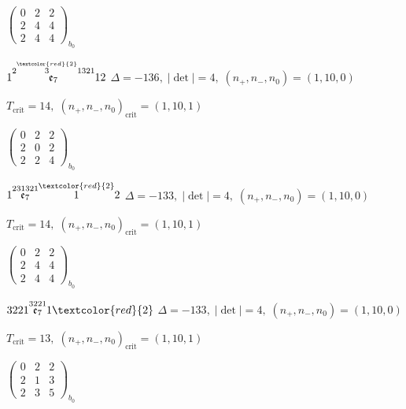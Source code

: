 \documentclass[10pt]{article}
\begin{document}
\hspace{2em}$\left(\begin{smallmatrix}0 & 2 & 2 \\ 2 & 4 & 4 \\ 2 & 4 & 4\end{smallmatrix}\right)_{\!b_0}$

\smallskip

$1\overset{2\overset{\textcolor{red}{2}}{3}1321}{\mathfrak{e}_7}12$ \quad $\Delta=-136,\; |\det|=4,\; (n_+,n_-,n_0)=(1,10,0)$

\hspace{1em}$T_{\text{crit}}=14,\; (n_+,n_-,n_0)_{\text{crit}}=(1,10,1)$

\hspace{2em}$\left(\begin{smallmatrix}0 & 2 & 2 \\ 2 & 0 & 2 \\ 2 & 2 & 4\end{smallmatrix}\right)_{\!b_0}$

$1\overset{231321}{\mathfrak{e}_7}\overset{\textcolor{red}{2}}{1}2$ \quad $\Delta=-133,\; |\det|=4,\; (n_+,n_-,n_0)=(1,10,0)$

\hspace{1em}$T_{\text{crit}}=14,\; (n_+,n_-,n_0)_{\text{crit}}=(1,10,1)$

\hspace{2em}$\left(\begin{smallmatrix}0 & 2 & 2 \\ 2 & 4 & 4 \\ 2 & 4 & 4\end{smallmatrix}\right)_{\!b_0}$

\smallskip

$3221\overset{3221}{\mathfrak{e}_7}1\textcolor{red}{2}$ \quad $\Delta=-133,\; |\det|=4,\; (n_+,n_-,n_0)=(1,10,0)$

\hspace{1em}$T_{\text{crit}}=13,\; (n_+,n_-,n_0)_{\text{crit}}=(1,10,1)$

\hspace{2em}$\left(\begin{smallmatrix}0 & 2 & 2 \\ 2 & 1 & 3 \\ 2 & 3 & 5\end{smallmatrix}\right)_{\!b_0}$

\smallskip
\end{document}
